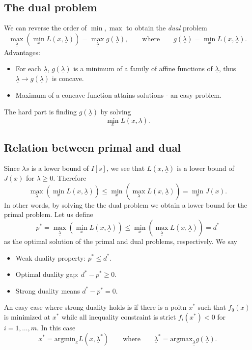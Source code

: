 \subsection{The dual problem} We can reverse the order of $\min, \max$ to obtain the \emph{dual} problem
\begin{equation*}
    \max_{\underline{\lambda}}\left( \min_{x} L(x,\underline{\lambda})\right) = \max_{\underline{\lambda}} g(\underline{\lambda}), \qquad \text{where}\qquad g(\underline{\lambda}) = \min_{x} L(x,\underline{\lambda}).
\end{equation*}
Advantages:
\begin{itemize}
    \item For each $\underline{\lambda}$, $g(\underline{\lambda})$ is a minimum of a family of affine functions of $\underline{\lambda}$, thus $\underline{\lambda}\to g(\underline{\lambda})$ is concave.
    \item Maximum of a concave function attains solutions - an easy problem.
\end{itemize}
The hard part is finding $g(\underline{\lambda})$ by solving
\begin{equation*}
    \min_{x} L(x,\underline{\lambda}).    
\end{equation*}
\subsection{Relation between primal and dual} Since $\lambda s$ is a lower bound of $I[s]$, we see that $L(x,\underline{\lambda})$ is a lower bound of $J(x)$ for $\lambda\geq 0$. Therefore
\begin{equation*}
     \max_{\underline{\lambda}}\left( \min_{x} L(x,\underline{\lambda})\right)  \leq  \min_{x}\left( \max_{\underline{\lambda}} L(x,\underline{\lambda})\right)  = \min_{x} J(x).
\end{equation*}
In other words, by solving the the dual problem we obtain a lower bound for the primal problem. Let us define
\begin{equation*}
    p^* =  \max_{\underline{\lambda}}\left( \min_{x} L(x,\underline{\lambda})\right) \leq \min_{x}\left( \max_{\underline{\lambda}} L(x,\underline{\lambda})\right)  = d^*
\end{equation*}
as the optimal solution of the primal and dual problems, respectively. We say
\begin{itemize}
    \item Weak duality property: $p^*\leq d^*$.
    \item Optimal duality gap: $d^*-p^* \geq 0$.
    \item Strong duality means $d^*-p^* = 0$.
\end{itemize}
An easy case where strong duality holds is if there is a poitn $x^*$ such that $f_0(x)$ is minimized at $x^*$ while all inequality constraint is strict $f_i(x^*)<0$ for $i=1,\ldots, m$. In this case 
\begin{equation*}
    x^* = \mathrm{argmin}_{x} L(x,\underline{\lambda}^*) \qquad\text{where}\qquad \underline{\lambda}^* = \mathrm{argmax}_{\underline{\lambda}} g(\underline{\lambda}).
\end{equation*}
